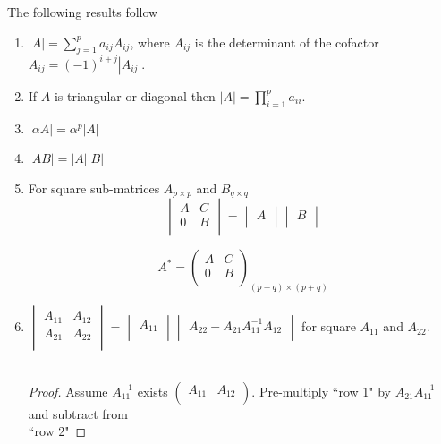 \documentclass[11pt,a4paper]{article}
\theoremstyle{definition}
\begin{document}
The following results follow
\begin{enumerate}
\item $|A|= \displaystyle{\sum^p_{j=1}a_{ij}A_{ij}}$, where $A_{ij}$ is the determinant of the cofactor $\displaystyle{A_{ij}=(-1)^{i+j}|A_{ij}|}$.

\item If $A$ is triangular or diagonal then $\displaystyle{|A| = \prod^p_{i=1} a_{ii}}$.

\item $\displaystyle{|\alpha A| = \alpha^p |A|}$

\item $\displaystyle{|AB| = |A||B|}$

\item For square sub-matrices $A_{p\times p}$ and $B_{q\times q}$
$$
\begin{vmatrix}
A & C\\
0 & B\\
\end{vmatrix} = \begin{vmatrix}
A\\
\end{vmatrix}\begin{vmatrix}
B\\
\end{vmatrix}
$$

$$A^* =
\begin{pmatrix}
A & C\\
0 & B\\
\end{pmatrix}_{(p + q)\times (p + q)}
$$


\item $\displaystyle{
\begin{vmatrix}
A_{11} & A_{12}\\
A_{21} & A_{22}\\
\end{vmatrix}=\begin{vmatrix}
A_{11}\\
\end{vmatrix}\begin{vmatrix}
A_{22} - A_{21}A^{-1}_{11}A_{12}\\
\end{vmatrix}
}$ for square $A_{11}$ and $A_{22}$.\\\\




\begin{proof}
Assume $A^{-1}_{11}$ exists $   
\begin{pmatrix}
A_{11} & A_{12}\\
\end{pmatrix}
$. Pre-multiply ``row 1" by $A_{21}A^{-1}_{11}$ and subtract from\\ ``row 2"
\end{proof}



\end{enumerate}
\end{document}
